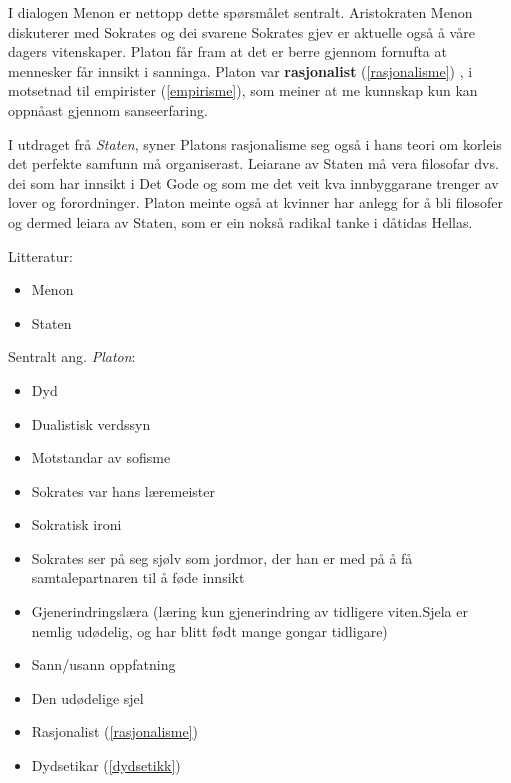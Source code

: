 \documentclass[a4paper]{IEEEtran}
\begin{document}
I dialogen Menon er nettopp dette spørsmålet sentralt. Aristokraten Menon diskuterer med Sokrates og dei svarene Sokrates gjev er aktuelle også å våre dagers vitenskaper. Platon får fram at det er berre gjennom fornufta at mennesker får innsikt i sanninga. Platon var \textbf{rasjonalist} (\ref{rasjonalisme}) , i motsetnad til empirister (\ref{empirisme}), som meiner at me kunnskap kun kan oppnåast gjennom sanseerfaring.\bigskip

I utdraget frå \textit{Staten}, syner Platons rasjonalisme seg også i hans teori om korleis det perfekte samfunn må organiserast. Leiarane av Staten må vera filosofar dvs. dei som har innsikt i Det Gode og som me det veit kva innbyggarane trenger av lover og forordninger. Platon meinte også at kvinner har anlegg for å bli filosofer og dermed leiara av Staten, som er ein nokså radikal tanke i dåtidas Hellas.\bigskip

\begin{center}
Litteratur:    
\end{center}

\begin{itemize}
    \item Menon
    \item Staten
\end{itemize}\bigskip 

\begin{center}
Sentralt ang. \textit{Platon}:    
\end{center}

\begin{itemize}
    \bigskip
    
    \item Dyd
    \item Dualistisk verdssyn
    \item Motstandar av sofisme
    \item Sokrates var hans læremeister
    \item Sokratisk ironi
    \item Sokrates ser på seg sjølv som jordmor, der han er med på å få samtalepartnaren til å føde innsikt
    \item Gjenerindringslæra (læring kun gjenerindring av tidligere viten.Sjela er nemlig udødelig, og har blitt født mange gongar tidligare)
    \item Sann/usann oppfatning
    \item Den udødelige sjel
    \item Rasjonalist (\ref{rasjonalisme})
    \item Dydsetikar (\ref{dydsetikk})
     
\end{itemize}\bigskip
\end{document}
